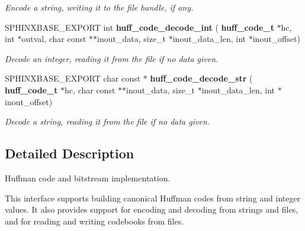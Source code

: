 \begin{DoxyCompactItemize}
\begin{DoxyCompactList}\small\item\em Encode a string, writing it to the file handle, if any. \end{DoxyCompactList}\item 
\mbox{\label{huff__code_8h_a9155dd07a0a24393ef0e4e66cb314140}} 
S\+P\+H\+I\+N\+X\+B\+A\+S\+E\+\_\+\+E\+X\+P\+O\+RT int \textbf{ huff\+\_\+code\+\_\+decode\+\_\+int} (\textbf{ huff\+\_\+code\+\_\+t} $\ast$hc, int $\ast$outval, char const $\ast$$\ast$inout\+\_\+data, size\+\_\+t $\ast$inout\+\_\+data\+\_\+len, int $\ast$inout\+\_\+offset)
\begin{DoxyCompactList}\small\item\em Decode an integer, reading it from the file if no data given. \end{DoxyCompactList}\item 
\mbox{\label{huff__code_8h_aec0908ece3a695f8a3f6619d8d726e57}} 
S\+P\+H\+I\+N\+X\+B\+A\+S\+E\+\_\+\+E\+X\+P\+O\+RT char const  $\ast$ \textbf{ huff\+\_\+code\+\_\+decode\+\_\+str} (\textbf{ huff\+\_\+code\+\_\+t} $\ast$hc, char const $\ast$$\ast$inout\+\_\+data, size\+\_\+t $\ast$inout\+\_\+data\+\_\+len, int $\ast$inout\+\_\+offset)
\begin{DoxyCompactList}\small\item\em Decode a string, reading it from the file if no data given. \end{DoxyCompactList}\end{DoxyCompactItemize}


\subsection{Detailed Description}
Huffman code and bitstream implementation. 

This interface supports building canonical Huffman codes from string and integer values. It also provides support for encoding and decoding from strings and files, and for reading and writing codebooks from files. 